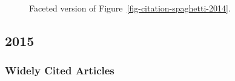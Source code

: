 \documentclass[
  10pt,
  letterpaper,
  DIV=11,
  numbers=noendperiod,
  twoside]{scrartcl}
\begin{document}
\begin{figure}


\caption{\label{fig-citation-facet-2014}Faceted version of
Figure~\ref{fig-citation-spaghetti-2014}.}

\end{figure}%

\newpage

\subsection{2015}\label{sec-s2015}

\subsubsection*{Widely Cited Articles}\label{widely-cited-articles-59}
\end{document}
